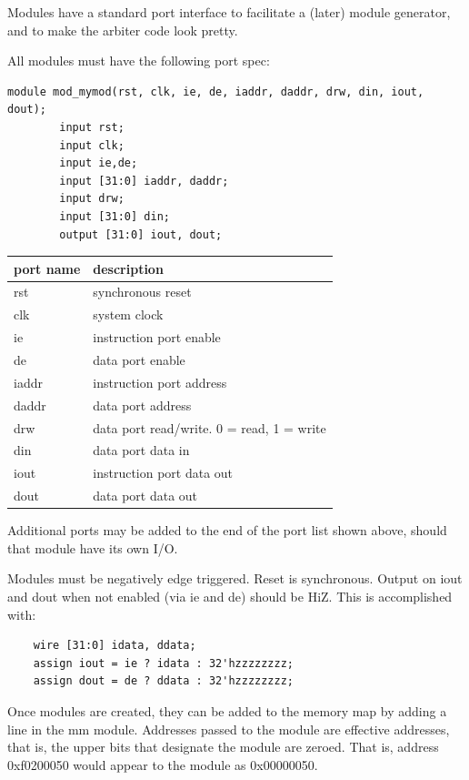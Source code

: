 \documentclass{article}
\begin{document}
Modules have a standard port interface to facilitate a (later) module generator, and to make the arbiter code look pretty.

All modules must have the following port spec:

\begin{verbatim}
module mod_mymod(rst, clk, ie, de, iaddr, daddr, drw, din, iout, dout);
        input rst;
        input clk;
        input ie,de;
        input [31:0] iaddr, daddr;
        input drw;
        input [31:0] din;
        output [31:0] iout, dout;
\end{verbatim}

\begin{tabular}{|l|l|}
  \hline
  \textbf{port name} & \textbf{description}    \\ \hline
  rst	             & synchronous reset       \\ \hline
  clk                & system clock            \\ \hline
  ie	             & instruction port enable \\ \hline
  de                 & data port enable        \\ \hline
  iaddr              & instruction port address\\ \hline
  daddr	             & data port address       \\ \hline
  drw	             & data port read/write. 0 = read, 1 = write \\ \hline
  din                & data port data in       \\ \hline
  iout               & instruction port data out\\ \hline
  dout               & data port data out      \\ \hline
\end{tabular}

Additional ports may be added to the end of the port list shown above, should that module have its own I/O.

Modules must be negatively edge triggered. Reset is synchronous. Output on iout and dout when not enabled (via ie and de) should be HiZ. This is accomplished with:

\begin{verbatim}
	wire [31:0] idata, ddata;
	assign iout = ie ? idata : 32'hzzzzzzzz;
	assign dout = de ? ddata : 32'hzzzzzzzz;
\end{verbatim}

Once modules are created, they can be added to the memory map by adding a line in the mm module. Addresses passed to the module are effective addresses, that is, the upper bits that designate the module are zeroed. That is, address 0xf0200050 would appear to the module as 0x00000050.
\end{document}

